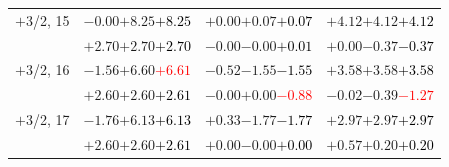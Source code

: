 \documentclass[compress]{beamer}
\begin{document}
\begin{frame}
\begin{tabular}{r | c | c | c}
$+$3/2, 15 & $-0.00$\hspace{0.1 cm}$+8.25$\hspace{0.1 cm}\textcolor{black}{$+8.25$} & $+0.00$\hspace{0.1 cm}$+0.07$\hspace{0.1 cm}\textcolor{black}{$+0.07$} & $+4.12$\hspace{0.1 cm}$+4.12$\hspace{0.1 cm}\textcolor{black}{$+4.12$} \\
           & $+2.70$\hspace{0.1 cm}$+2.70$\hspace{0.1 cm}\textcolor{black}{$+2.70$} & $-0.00$\hspace{0.1 cm}$-0.00$\hspace{0.1 cm}\textcolor{black}{$+0.01$} & $+0.00$\hspace{0.1 cm}$-0.37$\hspace{0.1 cm}\textcolor{black}{$-0.37$} \\
$+$3/2, 16 & $-1.56$\hspace{0.1 cm}$+6.60$\hspace{0.1 cm}\textcolor{red}{$+6.61$} & $-0.52$\hspace{0.1 cm}$-1.55$\hspace{0.1 cm}\textcolor{black}{$-1.55$} & $+3.58$\hspace{0.1 cm}$+3.58$\hspace{0.1 cm}\textcolor{black}{$+3.58$} \\
           & $+2.60$\hspace{0.1 cm}$+2.60$\hspace{0.1 cm}\textcolor{black}{$+2.61$} & $-0.00$\hspace{0.1 cm}$+0.00$\hspace{0.1 cm}\textcolor{red}{$-0.88$} & $-0.02$\hspace{0.1 cm}$-0.39$\hspace{0.1 cm}\textcolor{red}{$-1.27$} \\
$+$3/2, 17 & $-1.76$\hspace{0.1 cm}$+6.13$\hspace{0.1 cm}\textcolor{black}{$+6.13$} & $+0.33$\hspace{0.1 cm}$-1.77$\hspace{0.1 cm}\textcolor{black}{$-1.77$} & $+2.97$\hspace{0.1 cm}$+2.97$\hspace{0.1 cm}\textcolor{black}{$+2.97$} \\
           & $+2.60$\hspace{0.1 cm}$+2.60$\hspace{0.1 cm}\textcolor{black}{$+2.61$} & $+0.00$\hspace{0.1 cm}$-0.00$\hspace{0.1 cm}\textcolor{black}{$+0.00$} & $+0.57$\hspace{0.1 cm}$+0.20$\hspace{0.1 cm}\textcolor{black}{$+0.20$} \\

\end{tabular}
\end{frame}
\end{document}
